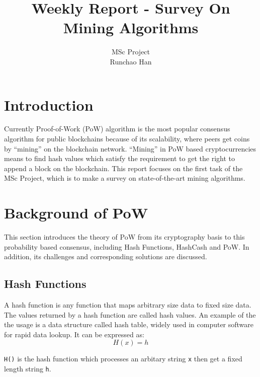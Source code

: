 \documentclass[11pt]{article}
\begin{document}
\title{Weekly Report - Survey On Mining Algorithms}
\author{MSc Project \\
Runchao Han \\
}
\maketitle
%
%
\section{Introduction}

Currently Proof-of-Work (PoW) algorithm is the most popular consensus algorithm for public blockchains because of its scalability, where peers get coins by ``mining'' on the blockchain network. ``Mining'' in PoW based cryptocurrencies means to find hash values which satisfy the requirement to get the right to append a block on the blockchain. This report focuses on the first task of the MSc Project, which is to make a survey on state-of-the-art mining algorithms.

\section{Background of PoW}

This section introduces the theory of PoW from its cryptography basis to this probability based consensus, including Hash Functions, HashCash and PoW. In addition, its challenges and corresponding solutions are discussed.

\subsection{Hash Functions}

A hash function is any function that maps arbitrary size data to fixed size data. The values returned by a hash function are called hash values. An example of the the usage is a data structure called hash table, widely used in computer software for rapid data lookup. It can be expressed as: \[ H(x) = h \]

\texttt{H()} is the hash function which processes an arbitary string \texttt{x} then get a fixed length string \texttt{h}.
\end{document}
